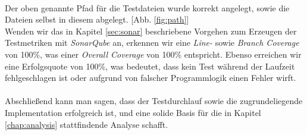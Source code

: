 \\
Der oben genannte Pfad für die Testdateien wurde korrekt angelegt, sowie die Dateien selbst in diesem abgelegt. [Abb. \ref{fig:path}]
\\
Wenden wir das in Kapitel \ref{sec:sonar} beschriebene Vorgehen zum Erzeugen der Testmetriken mit \textit{SonarQube} an, erkennen wir eine \textit{Line-} sowie \textit{Branch Coverage} von 100\%, was einer \textit{Overall Coverage} von 100\% entspricht. Ebenso erreichen wir eine Erfolgsquote von 100\%, was bedeutet, dass kein Test während der Laufzeit fehlgeschlagen ist oder aufgrund von falscher Programmlogik einen Fehler wirft.\\\\
Abschließend kann man sagen, dass der Testdurchlauf sowie die zugrundeliegende Implementation erfolgreich ist, und eine solide Basis für die in Kapitel \ref{chap:analysis} stattfindende Analyse schafft.




